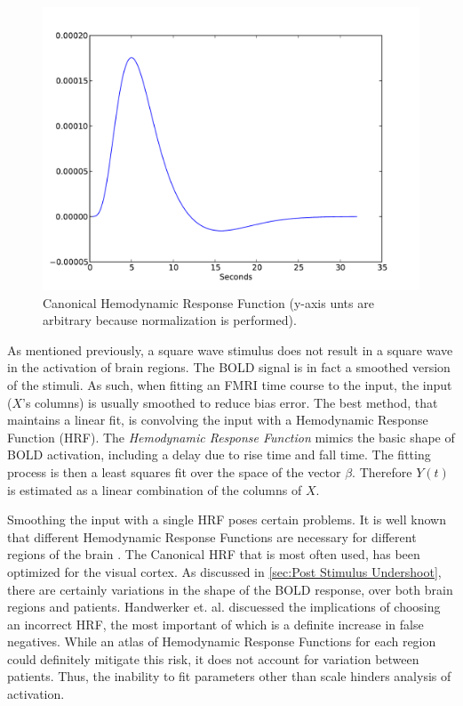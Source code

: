 \begin{figure}
\centering
\includegraphics[scale=.7]{images/HRF}
\caption{Canonical Hemodynamic Response Function (y-axis unts are arbitrary because 
normalization is performed).}
\label{fig:HRF}
\end{figure}

As mentioned previously, a square wave stimulus 
does not result in a square wave in the activation of brain regions. 
The BOLD signal is in fact a smoothed version of the 
stimuli. As such, when fitting an FMRI time course to the input,
the input ($X$'s columns) is usually smoothed to reduce bias error. 
The best method, that maintains a linear fit, is convolving the input 
with a Hemodynamic 
Response Function (HRF). The \emph{Hemodynamic Response Function}
mimics the basic shape of BOLD activation, including a delay
due to rise time and fall time. The fitting 
process is then a least squares fit over the space of the vector $\beta$. 
Therefore $Y(t)$ is estimated as a linear combination 
of the columns of $X$. 

Smoothing the input with a single HRF poses certain problems.
It is well known that different Hemodynamic Response Functions are necessary 
for different regions of the brain \cite{Handwerker2004}. The Canonical HRF that is most often used, 
has been optimized for the visual cortex. As discussed in \autoref{sec:Post Stimulus Undershoot},
there are certainly variations in the shape of the
BOLD response, over both brain regions and patients. Handwerker et. al. \cite{Handwerker2004}
discuessed the implications of choosing an incorrect HRF, the most important
of which is a definite increase in false negatives. While an atlas
of Hemodynamic Response Functions for each region could definitely 
mitigate this risk, it does not account for variation between patients.
Thus, the inability to fit parameters other than scale hinders 
analysis of activation. 

